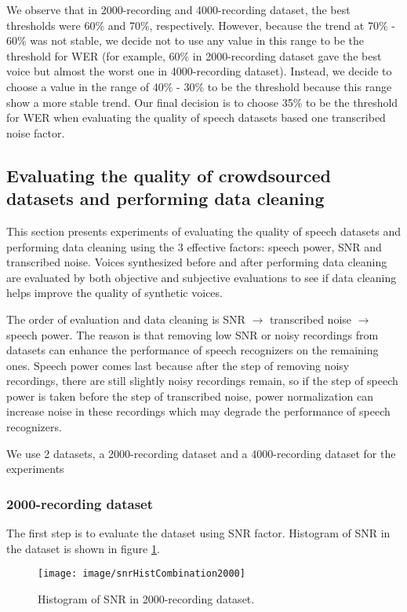 \documentclass[12pt]{article}
\begin{document}
We observe that in 2000-recording and 4000-recording dataset, the best thresholds were 60\% and 70\%, respectively. However, because the trend at 70\% - 60\% was not stable, we decide not to use any value in this range to be the threshold for WER (for example, 60\% in 2000-recording dataset gave the best voice but almost the worst one in 4000-recording dataset).  Instead, we decide to choose a value in the range of 40\% - 30\% to be the threshold because this range show a more stable trend. Our final decision is to choose 35\% to be the threshold for WER when evaluating the quality of speech datasets based one transcribed noise factor.

\subsection{Evaluating the quality of crowdsourced datasets and performing data cleaning}
This section presents experiments of evaluating the quality of speech datasets and performing data cleaning using the 3 effective factors: speech power, SNR and transcribed noise. Voices synthesized before and after performing data cleaning are evaluated by both objective and subjective evaluations to see if data cleaning helps improve the quality of synthetic voices.

The order of evaluation and data cleaning is SNR $\rightarrow$ transcribed noise 	$\rightarrow$ speech power. The reason is that removing low SNR or noisy recordings from datasets can enhance the performance of speech recognizers on the remaining ones. Speech power comes last because after the step of removing noisy recordings, there are still slightly noisy recordings remain, so if the step of speech power is taken before the step of transcribed noise, power normalization can increase noise in these recordings which may degrade the performance of speech recognizers.

We use 2 datasets, a 2000-recording dataset and a 4000-recording dataset for the experiments

\subsubsection{2000-recording dataset}
The first step is to evaluate the dataset using SNR factor. Histogram of SNR in the dataset is shown in figure \ref{fig_snrHistCombination2000}.

\begin{figure}[t]
\begin{center}
\texttt{[image: image/snrHistCombination2000]}
\end{center}
\vspace{-0.3cm}
\caption[SNR hist combination 2000.]{Histogram of SNR in 2000-recording dataset.}
\label{fig_snrHistCombination2000}
\end{figure}
\end{document}

